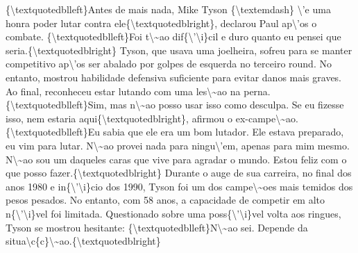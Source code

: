\documentclass{article}%
\begin{document}
\newline%
\{\textbackslash{}textquotedblleft\}Antes de mais nada, Mike Tyson \{\textbackslash{}textemdash\} \textbackslash{}'e uma honra poder lutar contra ele\{\textbackslash{}textquotedblright\}, declarou Paul ap\textbackslash{}'os o combate. \{\textbackslash{}textquotedblleft\}Foi t\textbackslash{}\textasciitilde{}ao dif\{\textbackslash{}'\textbackslash{}i\}cil e duro quanto eu pensei que seria.\{\textbackslash{}textquotedblright\}\newline%
\newline%
Tyson, que usava uma joelheira, sofreu para se manter competitivo ap\textbackslash{}'os ser abalado por golpes de esquerda no terceiro round. No entanto, mostrou habilidade defensiva suficiente para evitar danos mais graves. Ao final, reconheceu estar lutando com uma les\textbackslash{}\textasciitilde{}ao na perna. \{\textbackslash{}textquotedblleft\}Sim, mas n\textbackslash{}\textasciitilde{}ao posso usar isso como desculpa. Se eu fizesse isso, nem estaria aqui\{\textbackslash{}textquotedblright\}, afirmou o ex{-}campe\textbackslash{}\textasciitilde{}ao. \{\textbackslash{}textquotedblleft\}Eu sabia que ele era um bom lutador. Ele estava preparado, eu vim para lutar. N\textbackslash{}\textasciitilde{}ao provei nada para ningu\textbackslash{}'em, apenas para mim mesmo. N\textbackslash{}\textasciitilde{}ao sou um daqueles caras que vive para agradar o mundo. Estou feliz com o que posso fazer.\{\textbackslash{}textquotedblright\}\newline%
\newline%
Durante o auge de sua carreira, no final dos anos 1980 e in\{\textbackslash{}'\textbackslash{}i\}cio dos 1990, Tyson foi um dos campe\textbackslash{}\textasciitilde{}oes mais temidos dos pesos pesados. No entanto, com 58 anos, a capacidade de competir em alto n\{\textbackslash{}'\textbackslash{}i\}vel foi limitada. Questionado sobre uma poss\{\textbackslash{}'\textbackslash{}i\}vel volta aos ringues, Tyson se mostrou hesitante: \{\textbackslash{}textquotedblleft\}N\textbackslash{}\textasciitilde{}ao sei. Depende da situa\textbackslash{}c\{c\}\textbackslash{}\textasciitilde{}ao.\{\textbackslash{}textquotedblright\}\newline%
\newline%
\end{document}
